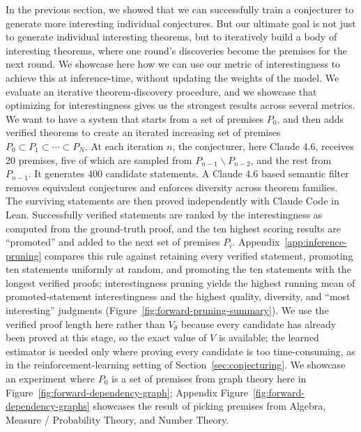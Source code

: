 In the previous section, we showed that we can successfully train a conjecturer to generate more interesting individual conjectures. 
%
But our ultimate goal is not just to generate individual interesting theorems, but to iteratively build a body of interesting theorems, where one round's discoveries become the premises for the next round. 
%
We showcase here how we can use our metric of interestingness to achieve this at inference-time, without updating the weights of the model.
%
We evaluate an iterative theorem-discovery procedure, and we showcase that optimizing for interestingness gives us the strongest results across several metrics.
%
We want to have a system that starts from a set of premises $P_0$, and then adds verified theorems to create an iterated increasing set of premises $P_0 \subset P_1 \subset \cdots \subset P_N$.
%
At each iteration $n$, the conjecturer, here Claude 4.6, receives 20 premises, five of which are sampled from $P_{n-1} \backslash P_{n-2}$, and the rest from $P_{n-1}$. 
%
It generates 400 candidate statements. 
%
A Claude 4.6 based semantic filter removes equivalent conjectures and enforces diversity across theorem families. 
%
The surviving statements are then proved independently with Claude Code in Lean. 
%
Successfully verified statements are ranked by the interestingness as computed from the ground-truth proof, and the ten highest scoring results are ``promoted'' and added to the next set of premises $P_i$.
%
Appendix~\ref{app:inference-pruning} compares this rule against retaining every verified statement, promoting ten statements uniformly at random, and promoting the ten statements with the longest verified proofs; interestingness pruning yields the highest running mean of promoted-statement interestingness and the highest quality, diversity, and ``most interesting'' judgments (Figure~\ref{fig:forward-pruning-summary}).
%
We use the verified proof length here rather than $V_\theta$ because every candidate has already been proved at this stage, so the exact value of $V$ is available; the learned estimator is needed only where proving every candidate is too time-consuming, as in the reinforcement-learning setting of Section~\ref{sec:conjecturing}.
%
We showcase an experiment where $P_0$ is a set of premises from graph theory here in Figure~\ref{fig:forward-dependency-graph}; Appendix Figure~\ref{fig:forward-dependency-graphs} showcases the result of picking premises from Algebra, Measure / Probability Theory, and Number Theory.

